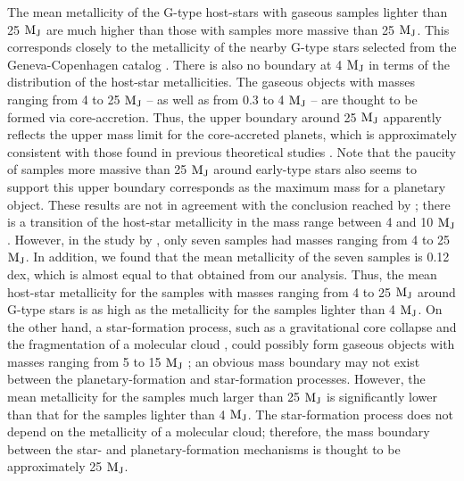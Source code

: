 \documentclass[twocolumn]{aastex62}
\begin{document}
\begin{CJK*}{UTF8}{min}
The mean metallicity of the G-type host-stars with gaseous samples lighter than 25 $\rm M_J$ are much higher than those with samples more massive than 25 $\rm M_J$. This corresponds closely to the metallicity of the nearby G-type stars selected from the Geneva-Copenhagen catalog \citep{2011A&A...530A.138C}. There is also no boundary at 4 $\rm M_J$ in terms of the distribution of the host-star metallicities. The gaseous objects with masses ranging from 4 to 25 $\rm M_J$ -- as well as from 0.3 to 4 $\rm M_J$ -- are thought to be formed via core-accretion. Thus, the upper boundary around 25 $\rm M_J$ apparently reflects the upper mass limit for the core-accreted planets, which is approximately consistent with those found in previous theoretical studies \citep[e.g.,][]{2007ApJ...667..557T, 2009A&A...501.1161M, 2016ApJ...823...48T}. Note that the paucity of samples more massive than 25 $\rm M_J$ around early-type stars also seems to support this upper boundary corresponds as the maximum mass for a planetary object. These results are not in agreement with the conclusion reached by \cite{2018ApJ...853...37S}; there is a transition of the host-star metallicity in the mass range between 4 and 10 $\rm M_J$. However, in the study by \cite{2018ApJ...853...37S}, only seven samples had masses ranging from 4 to 25 $\rm M_J$. In addition, we found that the mean metallicity of the seven samples is 0.12 dex, which is almost equal to that obtained from our analysis. Thus, the mean host-star metallicity for the samples with masses ranging from 4 to 25 $\rm M_J$ around G-type stars is as high as the metallicity for the samples lighter than 4 $\rm M_J$. On the other hand, a star-formation process, such as a gravitational core collapse and the fragmentation of a molecular cloud \citep{2004ApJ...617..559P, 2008ApJ...684..395H}, could possibly form gaseous objects with masses ranging from 5 to 15 $\rm M_J$ \citep{2001ApJ...551L.167B}; an obvious mass boundary may not exist between the planetary-formation and star-formation processes. However, the mean metallicity for the samples much larger than 25 $\rm M_J$ is significantly lower than that for the samples lighter than 4 $\rm M_J$. The star-formation process does not depend on the metallicity of a molecular cloud; therefore, the mass boundary between the star- and planetary-formation mechanisms is thought to be approximately 25 $\rm M_J$.


\end{CJK*}
\end{document}
